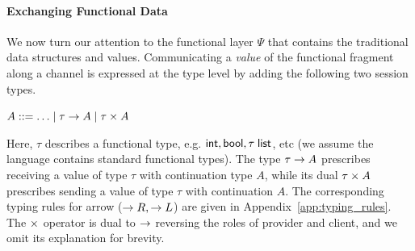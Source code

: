 

\paragraph*{\textbf{Exchanging Functional Data}}
We now turn our attention to the functional layer $\Psi$ that contains the
traditional data structures and values.
Communicating a \emph{value} of the functional fragment along a channel
is expressed at the type level by adding the following two session types.
\begin{center}
\begin{minipage}{0cm}
\begin{tabbing}
$A ::= \ldots \mid \tau \rightarrow A \mid \tau \times A$
\end{tabbing}
\end{minipage}
\end{center}
Here, $\tau$ describes a functional type, e.g. $\mathsf{int}, \mathsf{bool}, \tau \; \mathsf{list}$, etc
(we assume the language contains standard functional types).
The type $\tau \rightarrow A$ prescribes receiving a value of type $\tau$
with continuation type $A$, while its dual $\tau \times A$ prescribes
sending a value of type $\tau$ with continuation $A$. The corresponding
typing rules for arrow ($\rightarrow R, \rightarrow L$) are given in Appendix~\ref{app:typing_rules}.
The $\times$ operator is dual to $\rightarrow$ reversing the roles of provider and client,
and we omit its explanation for brevity.

